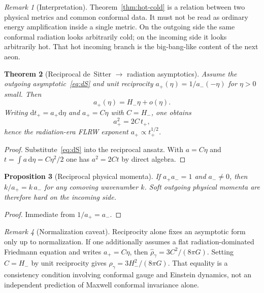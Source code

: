\documentclass[11pt]{article}
\newtheorem{theorem}{Theorem}[section]
\newtheorem{proposition}[theorem]{Proposition}
\theoremstyle{definition}
\theoremstyle{remark}
\newtheorem{remark}[theorem]{Remark}
\newcommand{\dd}{\mathrm{d}}
\begin{document}
\begin{remark}[Interpretation]
\label{rem:hotcold}
Theorem~\ref{thm:hot-cold} is a relation between two physical metrics and common conformal
data.
It must not be read as ordinary energy amplification inside a single metric.
On the outgoing side the same conformal radiation looks arbitrarily cold; on the incoming side
it looks arbitrarily hot.
That hot incoming branch is the big-bang-like content of the next aeon.
\end{remark}

\begin{theorem}[Reciprocal de~Sitter $\to$ radiation asymptotics]
\label{thm:radiation}
Assume the outgoing asymptotic~\eqref{eq:dS} and unit reciprocity $a_+(\eta)=1/a_-(-\eta)$ for
$\eta>0$ small.
Then
\begin{equation}
\label{eq:aPlus}
a_+(\eta)=H_-\eta+o(\eta).
\end{equation}
Writing $\dd t_+=a_+\dd\eta$ and $a_+=C\eta$ with $C=H_-$, one obtains
\begin{equation}
\label{eq:radiation}
a_+^{2}=2C\,t_+,
\end{equation}
hence the radiation-era FLRW exponent $a_+\propto t_+^{1/2}$.
\end{theorem}

\begin{proof}
Substitute~\eqref{eq:dS} into the reciprocal ansatz.
With $a=C\eta$ and $t=\int a\,\dd\eta=C\eta^{2}/2$ one has $a^{2}=2Ct$ by direct algebra.
\end{proof}

\begin{proposition}[Reciprocal physical momenta]
\label{prop:mom}
If $a_+a_-=1$ and $a_-\neq0$, then $k/a_+=k\,a_-$ for any comoving wavenumber $k$.
Soft outgoing physical momenta are therefore hard on the incoming side.
\end{proposition}

\begin{proof}
Immediate from $1/a_+=a_-$.
\end{proof}

\begin{remark}[Normalization caveat]
\label{rem:norm}
Reciprocity alone fixes an asymptotic form only up to normalization.
If one additionally assumes a flat radiation-dominated Friedmann equation and writes
$a_+=C\eta$, then $\hat\rho_\gamma=3C^{2}/(8\pi G)$.
Setting $C=H_-$ by unit reciprocity gives $\hat\rho_\gamma=3H_-^{2}/(8\pi G)$.
That equality is a consistency condition involving conformal gauge and Einstein dynamics, not
an independent prediction of Maxwell conformal invariance alone.
\end{remark}
\end{document}
